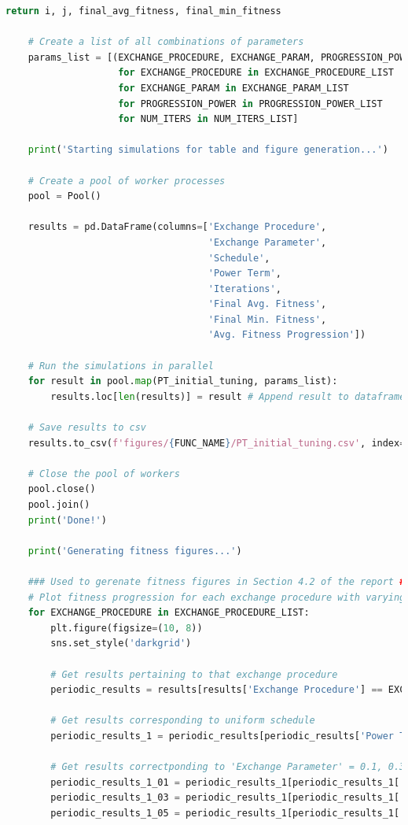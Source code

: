 \documentclass[10pt]{article}
\begin{document}
\begin{lstlisting}[language=Python, caption=PT\_TuningExperiments.py, label=PT_TuningExperimentspy]
        return i, j, final_avg_fitness, final_min_fitness
    
    # Create a list of all combinations of parameters
    params_list = [(EXCHANGE_PROCEDURE, EXCHANGE_PARAM, PROGRESSION_POWER, NUM_ITERS) 
                    for EXCHANGE_PROCEDURE in EXCHANGE_PROCEDURE_LIST
                    for EXCHANGE_PARAM in EXCHANGE_PARAM_LIST
                    for PROGRESSION_POWER in PROGRESSION_POWER_LIST
                    for NUM_ITERS in NUM_ITERS_LIST]
    
    print('Starting simulations for table and figure generation...')
    
    # Create a pool of worker processes
    pool = Pool()
    
    results = pd.DataFrame(columns=['Exchange Procedure', 
                                    'Exchange Parameter', 
                                    'Schedule', 
                                    'Power Term',
                                    'Iterations', 
                                    'Final Avg. Fitness', 
                                    'Final Min. Fitness',
                                    'Avg. Fitness Progression'])
    
    # Run the simulations in parallel
    for result in pool.map(PT_initial_tuning, params_list):
        results.loc[len(results)] = result # Append result to dataframe
    
    # Save results to csv
    results.to_csv(f'figures/{FUNC_NAME}/PT_initial_tuning.csv', index=False)
    
    # Close the pool of workers
    pool.close()
    pool.join()
    print('Done!')
    
    print('Generating fitness figures...')
    
    ### Used to gerenate fitness figures in Section 4.2 of the report ###
    # Plot fitness progression for each exchange procedure with varying power term
    for EXCHANGE_PROCEDURE in EXCHANGE_PROCEDURE_LIST:
        plt.figure(figsize=(10, 8))
        sns.set_style('darkgrid')
    
        # Get results pertaining to that exchange procedure
        periodic_results = results[results['Exchange Procedure'] == EXCHANGE_PROCEDURE]
    
        # Get results corresponding to uniform schedule
        periodic_results_1 = periodic_results[periodic_results['Power Term'] == 1]
    
        # Get results correctponding to 'Exchange Parameter' = 0.1, 0.3, 0.5
        periodic_results_1_01 = periodic_results_1[periodic_results_1['Exchange Parameter'] == 0.1]
        periodic_results_1_03 = periodic_results_1[periodic_results_1['Exchange Parameter'] == 0.3]
        periodic_results_1_05 = periodic_results_1[periodic_results_1['Exchange Parameter'] == 0.5]
    

\end{lstlisting}
\end{document}
